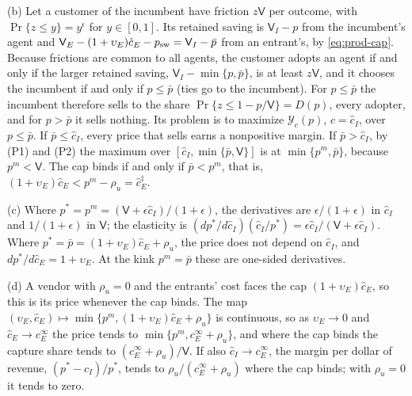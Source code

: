 (b) Let a customer of the incumbent have friction $z\mathsf V$ per outcome, with $\Pr\{z\le y\}=y^\epsilon$ for $y\in[0,1]$. Its retained saving is $\mathsf V_I-p$ from the incumbent's agent and $\mathsf V_E-(1+\upsilon_E)\hat c_E-p_{\rm sw}=\mathsf V_I-\bar p$ from an entrant's, by \eqref{eq:prod-cap}. Because frictions are common to all agents, the customer adopts an agent if and only if the larger retained saving, $\mathsf V_I-\min\{p,\bar p\}$, is at least $z\mathsf V$, and it chooses the incumbent if and only if $p\le\bar p$ (ties go to the incumbent). For $p\le\bar p$ the incumbent therefore sells to the share $\Pr\{z\le 1-p/\mathsf V\}=D(p)$, every adopter, and for $p>\bar p$ it sells nothing. Its problem is to maximize $\mathcal Y_c(p)$, $c=\hat c_I$, over $p\le\bar p$. If $\bar p\le\hat c_I$, every price that sells earns a nonpositive margin. If $\bar p>\hat c_I$, by (P1) and (P2) the maximum over $[\hat c_I,\min\{\bar p,\mathsf V\}]$ is at $\min\{p^m,\bar p\}$, because $p^m<\mathsf V$. The cap binds if and only if $\bar p<p^m$, that is, $(1+\upsilon_E)\hat c_E<p^m-\rho_u=\hat c^\ddagger_E$.

(c) Where $p^*=p^m=(\mathsf V+\epsilon\hat c_I)/(1+\epsilon)$, the derivatives are $\epsilon/(1+\epsilon)$ in $\hat c_I$ and $1/(1+\epsilon)$ in $\mathsf V$; the elasticity is $(dp^*/d\hat c_I)(\hat c_I/p^*)=\epsilon\hat c_I/(\mathsf V+\epsilon\hat c_I)$. Where $p^*=\bar p=(1+\upsilon_E)\hat c_E+\rho_u$, the price does not depend on $\hat c_I$, and $dp^*/d\hat c_E=1+\upsilon_E$. At the kink $p^m=\bar p$ these are one-sided derivatives.

(d) A vendor with $\rho_u=0$ and the entrants' cost faces the cap $(1+\upsilon_E)\hat c_E$, so this is its price whenever the cap binds. The map $(\upsilon_E,\hat c_E)\mapsto\min\{p^m,(1+\upsilon_E)\hat c_E+\rho_u\}$ is continuous, so as $\upsilon_E\to 0$ and $\hat c_E\to c_E^\infty$ the price tends to $\min\{p^m,c_E^\infty+\rho_u\}$, and where the cap binds the capture share tends to $(c_E^\infty+\rho_u)/\mathsf V$. If also $\hat c_I\to c_E^\infty$, the margin per dollar of revenue, $(p^*-\hat c_I)/p^*$, tends to $\rho_u/(c_E^\infty+\rho_u)$ where the cap binds; with $\rho_u=0$ it tends to zero.

